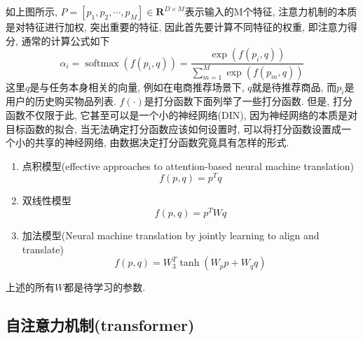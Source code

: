 如上图所示, $P=\left[p_{1}, p_{2}, \cdots, p_{M}\right] \in \mathbf{R}^{D \times M}$表示输入的M个特征, 注意力机制的本质是对特征进行加权, 突出重要的特征, 因此首先要计算不同特征的权重, 即注意力得分, 通常的计算公式如下
\begin{equation}
	\alpha_{i}=\operatorname{softmax}\left(f\left(p_{i}, q\right)\right)=\frac{\exp \left(f\left(p_{i}, q\right)\right)}{\sum_{m=1}^{M} \exp \left(f\left(p_{m}, q\right)\right)}
\end{equation}
这里$q$是与任务本身相关的向量, 例如在电商推荐场景下, $q$就是待推荐商品, 而$p_i$是用户的历史购买物品列表. $f(\cdot)$是打分函数下面列举了一些打分函数. 但是, 打分函数不仅限于此, 它甚至可以是一个小的神经网络(DIN), 因为神经网络的本质是对目标函数的拟合, 当无法确定打分函数应该如何设置时, 可以将打分函数设置成一个小的共享的神经网络, 由数据决定打分函数究竟具有怎样的形式.
\begin{enumerate}
	\item 点积模型(effective approaches to attention-based neural machine translation)
	\begin{equation}
	f(p, q)=p^{T} q
	\end{equation}
	\item 双线性模型
	\begin{equation}
		f(p, q)=p^{T}W q
	\end{equation}
	\item 加法模型(Neural machine translation by jointly learning to align and translate)
	\begin{equation}
		f(p, q)=W_{3}^{T} \tanh \left(W_{p} p+W_{q} q\right)
	\end{equation}
\end{enumerate}
上述的所有$W$都是待学习的参数.
\subsection{自注意力机制(transformer)}

